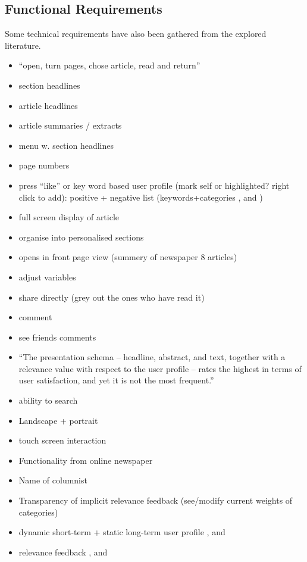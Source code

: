 \subsection{Functional Requirements}
Some technical requirements have also been gathered from the explored literature.
\begin{itemize}
	\item ``open, turn pages, chose article, read and return'' \cite[p. 6]{FULLTEXT01.pdf}
	\item section headlines \cite[p. 6-7]{kristin_fredrik.pdf}
	\item article headlines
	\item article summaries / extracts \cite{fulltext.pdf}
	\item menu w. section headlines \cite[p. 8]{kristin_fredrik.pdf}
	\item page numbers \cite[p. 6-7]{kristin_fredrik.pdf}
	\item press ``like'' or key word based user profile (mark self or highlighted? right click to add): positive + negative list (keywords+categories \cite{10-1-1-19-5583}, \cite{fulltext.pdf} and \cite{gervasum2001ws.pdf})
	\item full screen display of article
	\item organise into personalised sections
	\item opens in front page view (summery of newspaper 8 articles) \cite[p. 8]{kristin_fredrik.pdf}
	\item adjust variables
	\item share directly (grey out the ones who have read it)
	\item comment
	\item see friends comments
	\item ``The presentation schema -- headline, abstract, and text, together with a relevance value with respect to the user profile -- rates the highest in terms of user satisfaction, and yet it is not the most frequent.'' \cite{Sections-categories-and-keywords-as-interest-specification-tools-for-personalised-news-services.pdf}
	\item  ability to search \cite[p. 7]{FULLTEXT01.pdf}
	\item Landscape + portrait \cite[p. 6-7]{kristin_fredrik.pdf}
	\item touch screen interaction \cite[p. 6-7]{kristin_fredrik.pdf}
	\item Functionality from online newspaper \cite{hcii2005_1004.pdf}
	\item Name of columnist \cite[p. 4]{gervasum2001ws.pdf}
	\item Transparency of implicit relevance feedback (see/modify current weights of categories) \cite[p. 7]{gervasum2001ws.pdf}
	\item dynamic short-term + static long-term user profile \cite{10-1-1-19-5583}, \cite{fulltext.pdf} and \cite{gervasum2001ws.pdf}
	\item relevance feedback \cite{10-1-1-19-5583}, \cite{fulltext.pdf} and \cite{gervasum2001ws.pdf}
\end{itemize}

